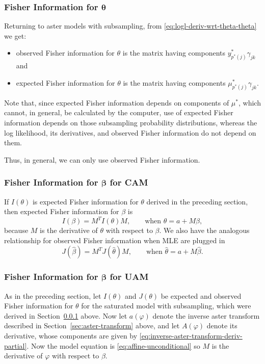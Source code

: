 \subsubsection{Fisher Information for $\boldsymbol{\theta}$}
\label{sec:I-J-theta}

Returning to aster models with subsampling, from
\eqref{eq:logl-deriv-wrt-theta-theta} we get:
\begin{itemize}
\item observed Fisher information for $\theta$ is the matrix having
components $y^*_{p^*(j)} \gamma_{j k}$ and
\item
expected Fisher information for $\theta$ is the matrix having
components $\mu^*_{p^*(j)} \gamma_{j k}$.
\end{itemize}
Note that, since expected Fisher information depends on
components of $\mu^*$, which cannot, in general, be calculated
by the computer,
use of expected Fisher information depends on those subsampling probability
distributions,
whereas the log likelihood, its derivatives, and observed Fisher information
do not depend on them.

Thus, in general, we can only use observed Fisher information.

\subsubsection{Fisher Information for $\boldsymbol{\beta}$ for CAM}
\label{sec:I-J-cam}

If $I(\theta)$ is expected Fisher information for $\theta$ derived
in the preceding section, then expected Fisher information for $\beta$ is
$$
   I(\beta) = M^T I(\theta) M, \qquad \text{when $\theta = a + M \beta$},
$$
because $M$ is the derivative of $\theta$ with respect to $\beta$.
We also have the analogous relationship for observed Fisher information
when MLE are plugged in
$$
   J(\hat{\beta})
   =
   M^T J(\hat{\theta}) M,
   \qquad \text{when $\hat{\theta} = a + M \hat{\beta}$}.
$$

\subsubsection{Fisher Information for $\boldsymbol{\beta}$ for UAM}
\label{sec:I-J-uam}

As in the preceding section, let $I(\theta)$ and $J(\theta)$ be expected
and observed Fisher information for $\theta$ for the saturated model with
subsampling, which were derived in Section~\ref{sec:I-J-theta} above.
Now let $a(\varphi)$ denote the inverse aster transform described in
Section~\ref{sec:aster-transform} above, and let $A(\varphi)$ denote
its derivative,
whose components are given by \eqref{eq:inverse-aster-transform-deriv-partial}.
Now the model equation is \eqref{eq:affine-unconditional}
so $M$ is the derivative of $\varphi$ with respect to $\beta$.

